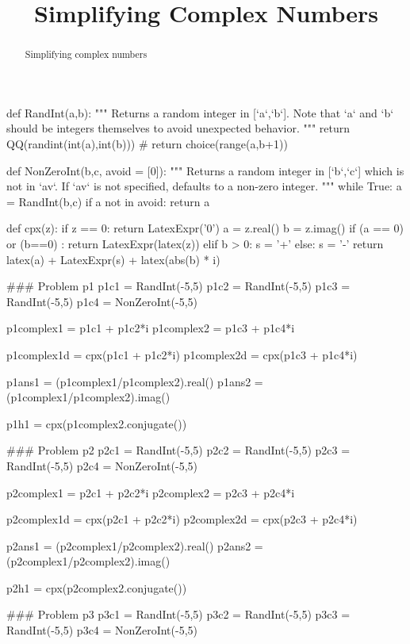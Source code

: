 \documentclass{ximera}
\title{Simplifying Complex Numbers}
\begin{document}
\begin{abstract}
    Simplifying complex numbers
\end{abstract}
\maketitle

\begin{sagesilent}
def RandInt(a,b):
    """ Returns a random integer in [`a`,`b`]. Note that `a` and `b` should be integers themselves to avoid unexpected behavior.
    """
    return QQ(randint(int(a),int(b)))
    # return choice(range(a,b+1))

def NonZeroInt(b,c, avoid = [0]):
    """ Returns a random integer in [`b`,`c`] which is not in `av`. 
        If `av` is not specified, defaults to a non-zero integer.
    """
    while True:
        a = RandInt(b,c)
        if a not in avoid:
            return a

def cpx(z):
    if z == 0:
        return LatexExpr('0')
    a = z.real()
    b = z.imag()
    if (a == 0) or (b==0) :
        return LatexExpr(latex(z))
    elif b > 0:
      s = '+'
    else:
      s = '-'
    return latex(a) + LatexExpr(s) + latex(abs(b) * i)



### Problem p1
p1c1 = RandInt(-5,5)
p1c2 = RandInt(-5,5)
p1c3 = RandInt(-5,5)
p1c4 = NonZeroInt(-5,5)

p1complex1 = p1c1 + p1c2*i
p1complex2 = p1c3 + p1c4*i

p1complex1d = cpx(p1c1 + p1c2*i)
p1complex2d = cpx(p1c3 + p1c4*i)

p1ans1 = (p1complex1/p1complex2).real()
p1ans2 = (p1complex1/p1complex2).imag()

p1h1 = cpx(p1complex2.conjugate())



### Problem p2
p2c1 = RandInt(-5,5)
p2c2 = RandInt(-5,5)
p2c3 = RandInt(-5,5)
p2c4 = NonZeroInt(-5,5)

p2complex1 = p2c1 + p2c2*i
p2complex2 = p2c3 + p2c4*i

p2complex1d = cpx(p2c1 + p2c2*i)
p2complex2d = cpx(p2c3 + p2c4*i)

p2ans1 = (p2complex1/p2complex2).real()
p2ans2 = (p2complex1/p2complex2).imag()

p2h1 = cpx(p2complex2.conjugate())


### Problem p3
p3c1 = RandInt(-5,5)
p3c2 = RandInt(-5,5)
p3c3 = RandInt(-5,5)
p3c4 = NonZeroInt(-5,5)


\end{sagesilent}
\end{document}
